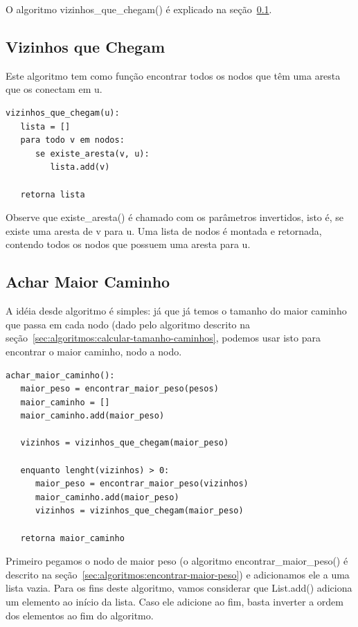 \documentclass[12pt]{article}
\begin{document}
O algoritmo {\sf vizinhos\_que\_chegam()} é explicado na se\c{c}ão~\ref{sec:algoritmos:vizinhos-que-chegam}.


\subsection{Vizinhos que Chegam}\label{sec:algoritmos:vizinhos-que-chegam}
Este algoritmo tem como fun\c{c}ão encontrar todos os nodos que têm uma aresta que os conectam em {\sf u}.
\begin{lstlisting}
vizinhos_que_chegam(u):
   lista = []
   para todo v em nodos:
      se existe_aresta(v, u):
         lista.add(v)

   retorna lista
\end{lstlisting}

Observe que {\sf existe\_aresta()} é chamado com os parâmetros invertidos, isto é, se existe uma aresta de {\sf v} para {\sf u}.
Uma lista de nodos é montada e retornada, contendo todos os nodos que possuem uma aresta para {\sf u}.


\subsection{Achar Maior Caminho}\label{sec:algoritmos:achar-maior-caminho}
A idéia desde algoritmo é simples: já que já temos o tamanho do maior caminho que passa em cada nodo (dado pelo algoritmo descrito na se\c{c}ão~\ref{sec:algoritmos:calcular-tamanho-caminhos}, podemos usar isto para encontrar o maior caminho, nodo a nodo.

\begin{lstlisting}
achar_maior_caminho():
   maior_peso = encontrar_maior_peso(pesos)
   maior_caminho = []
   maior_caminho.add(maior_peso)

   vizinhos = vizinhos_que_chegam(maior_peso)

   enquanto lenght(vizinhos) > 0:
      maior_peso = encontrar_maior_peso(vizinhos)
      maior_caminho.add(maior_peso)
      vizinhos = vizinhos_que_chegam(maior_peso)

   retorna maior_caminho
\end{lstlisting}

Primeiro pegamos o nodo de maior peso (o algoritmo {\sf encontrar\_maior\_peso()} é descrito na se\c{c}ão~\ref{sec:algoritmos:encontrar-maior-peso}) e adicionamos ele a uma lista vazia. Para os fins deste algoritmo, vamos considerar que {\sf List.add()} adiciona um elemento ao início da lista. Caso ele adicione ao fim, basta inverter a ordem dos elementos ao fim do algoritmo.
\end{document}
